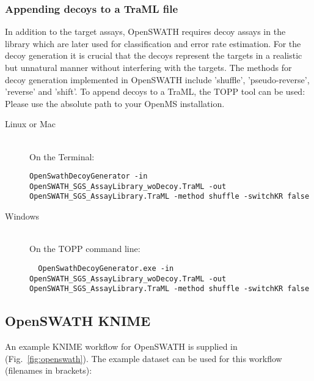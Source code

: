 \subsubsection{Appending decoys to a TraML file}
In addition to the target assays, OpenSWATH requires decoy assays in the library which are later used for classification and error rate estimation. For the decoy generation it is crucial that the decoys represent the targets in a realistic but unnatural manner without interfering with the targets. The methods for decoy generation implemented in OpenSWATH include 'shuffle', 'pseudo-reverse', 'reverse' and 'shift'. To append decoys to a TraML, the TOPP tool  can be used: Please use the absolute path to your OpenMS installation.

\begin{description}
  \item[Linux or Mac] \hfill \\
    On the Terminal:
    \begin{listing}
\begin{verbatim}
OpenSwathDecoyGenerator -in OpenSWATH_SGS_AssayLibrary_woDecoy.TraML -out OpenSWATH_SGS_AssayLibrary.TraML -method shuffle -switchKR false
    \end{verbatim}
\end{listing}
  \item[Windows] \hfill \\
    On the TOPP command line:
    \begin{listing}
\begin{verbatim}
  OpenSwathDecoyGenerator.exe -in OpenSWATH_SGS_AssayLibrary_woDecoy.TraML -out OpenSWATH_SGS_AssayLibrary.TraML -method shuffle -switchKR false
    \end{verbatim}
\end{listing}
\end{description}

\subsection{OpenSWATH KNIME}
An example KNIME workflow for OpenSWATH is supplied in  (Fig.~\ref{fig:openswath}). The example dataset can be used for this workflow (filenames in brackets):

